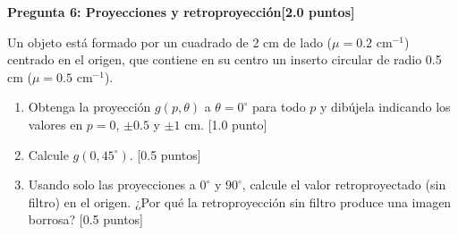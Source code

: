 \documentclass[11pt,a4paper]{article}
\newcommand{\question}[2]{\vspace{6pt}\textbf{#1}\hfill\textbf{[#2]}\par}
\newcommand{\pts}[1]{\hfill[#1]}
\begin{document}
\question{Pregunta 6: Proyecciones y retroproyección}{2.0 puntos}
Un objeto está formado por un cuadrado de 2 cm de lado ($\mu = 0.2$ cm$^{-1}$) centrado en el origen, que contiene en su centro un inserto circular de radio 0.5 cm ($\mu = 0.5$ cm$^{-1}$).
\begin{center}
\end{center}
\begin{enumerate}
\item Obtenga la proyección $g(p,\theta)$ a $\theta = 0^\circ$ para todo $p$ y dibújela indicando los valores en $p = 0$, $\pm0.5$ y $\pm1$ cm. \pts{1.0 punto}
\item Calcule $g(0, 45^\circ)$. \pts{0.5 puntos}
\item Usando solo las proyecciones a $0^\circ$ y $90^\circ$, calcule el valor retroproyectado (sin filtro) en el origen. ¿Por qué la retroproyección sin filtro produce una imagen borrosa? \pts{0.5 puntos}
\end{enumerate}
\end{document}
